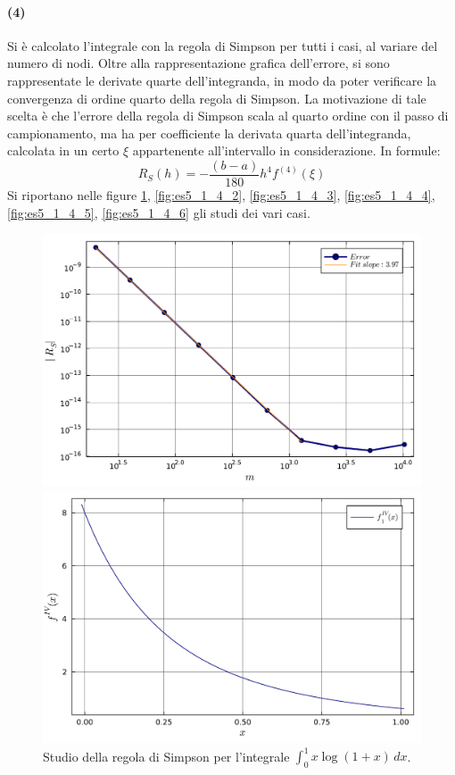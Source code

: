 \documentclass[letterpaper, 12pt]{article}
\begin{document}
\paragraph{(4) } Si è calcolato l'integrale con la regola di Simpson per tutti i casi, al variare del numero di
nodi. Oltre alla rappresentazione grafica dell'errore, si sono rappresentate le derivate quarte dell'integranda,
in modo da poter verificare la convergenza di ordine quarto della regola di Simpson. La motivazione
di tale scelta è che l'errore della regola di Simpson scala al quarto ordine con il passo di campionamento,
ma ha per coefficiente la derivata quarta dell'integranda, calcolata in un certo $\xi$ appartenente all'intervallo
in considerazione. In formule:
\[
R_S(h) = -\frac{(b-a)}{180}h^4 f^{(4)}(\xi)
\]
Si riportano nelle figure \ref{fig:es5_1_4_1}, \ref{fig:es5_1_4_2}, \ref{fig:es5_1_4_3},
\ref{fig:es5_1_4_4}, \ref{fig:es5_1_4_5}, \ref{fig:es5_1_4_6} gli studi dei vari casi.
\begin{figure}[!ht]
    \centering
    \begin{minipage}[b]{0.47\textwidth}
        \includegraphics[width=\textwidth]{5141.pdf}
    \end{minipage}
    \hspace{0.5cm}
    \begin{minipage}[b]{0.47\textwidth}
        \includegraphics[width=\textwidth]{5141_2.pdf}
    \end{minipage}
    \caption{Studio della regola di Simpson per l'integrale $\int_0^1 x\log(1+x)\, dx$.}
    \label{fig:es5_1_4_1}
\end{figure}
\end{document}
